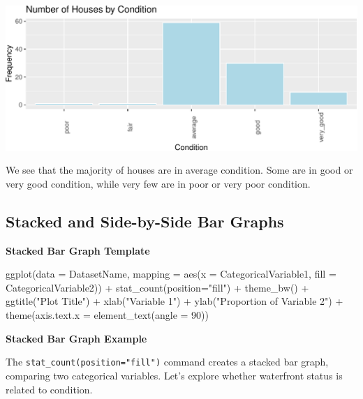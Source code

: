 \documentclass[
  letterpaper,
  DIV=11,
  numbers=noendperiod]{scrreprt}
\newenvironment{Shaded}{\begin{snugshade}}{\end{snugshade}}
\newcommand{\AttributeTok}[1]{\textcolor[rgb]{0.40,0.45,0.13}{#1}}
\newcommand{\DecValTok}[1]{\textcolor[rgb]{0.68,0.00,0.00}{#1}}
\newcommand{\FunctionTok}[1]{\textcolor[rgb]{0.28,0.35,0.67}{#1}}
\newcommand{\NormalTok}[1]{\textcolor[rgb]{0.00,0.23,0.31}{#1}}
\newcommand{\SpecialCharTok}[1]{\textcolor[rgb]{0.37,0.37,0.37}{#1}}
\newcommand{\StringTok}[1]{\textcolor[rgb]{0.13,0.47,0.30}{#1}}
\begin{document}
\includegraphics{Ch1_files/figure-pdf/unnamed-chunk-26-1.pdf}

We see that the majority of houses are in average condition. Some are in
good or very good condition, while very few are in poor or very poor
condition.

\subsection{Stacked and Side-by-Side Bar
Graphs}\label{stacked-and-side-by-side-bar-graphs}

\textbf{Stacked Bar Graph Template}

\begin{Shaded}
\begin{Highlighting}[]
\FunctionTok{ggplot}\NormalTok{(}\AttributeTok{data =}\NormalTok{ DatasetName, }\AttributeTok{mapping =} \FunctionTok{aes}\NormalTok{(}\AttributeTok{x =}\NormalTok{ CategoricalVariable1, }
                                         \AttributeTok{fill =}\NormalTok{ CategoricalVariable2)) }\SpecialCharTok{+}
    \FunctionTok{stat\_count}\NormalTok{(}\AttributeTok{position=}\StringTok{"fill"}\NormalTok{)  }\SpecialCharTok{+}
  \FunctionTok{theme\_bw}\NormalTok{() }\SpecialCharTok{+} \FunctionTok{ggtitle}\NormalTok{(}\StringTok{"Plot Title"}\NormalTok{) }\SpecialCharTok{+} 
  \FunctionTok{xlab}\NormalTok{(}\StringTok{"Variable 1"}\NormalTok{) }\SpecialCharTok{+} 
  \FunctionTok{ylab}\NormalTok{(}\StringTok{"Proportion of Variable 2"}\NormalTok{) }\SpecialCharTok{+}   
  \FunctionTok{theme}\NormalTok{(}\AttributeTok{axis.text.x =} \FunctionTok{element\_text}\NormalTok{(}\AttributeTok{angle =} \DecValTok{90}\NormalTok{)) }
\end{Highlighting}
\end{Shaded}

\textbf{Stacked Bar Graph Example}

The \texttt{stat\_count(position="fill")} command creates a stacked bar
graph, comparing two categorical variables. Let's explore whether
waterfront status is related to condition.
\end{document}
